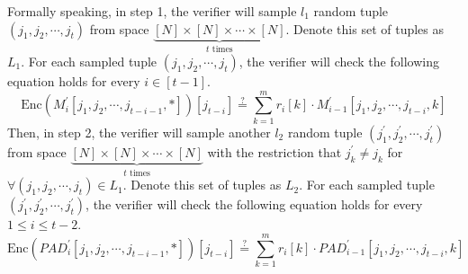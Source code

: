 \begin{itemize}
Formally speaking, in step 1, the verifier will sample $l_1$ random tuple $(j_1, j_2, \cdots, j_t)$ from space $\underbrace{[N] \times [N] \times \cdots \times [N]}_{t \text{ times}}$. Denote this set of tuples as $L_1$.
For each sampled tuple $(j_1, j_2, \cdots, j_t)$, the verifier will check the following equation holds for every $i \in [t-1]$.
$$
    \text{Enc}(M_i^\prime[j_1, j_2, \cdots, j_{t-i-1}, *])[j_{t-i}] \stackrel{?}{=} \sum_{k=1}^m r_i[k] \cdot M_{i-1}^{\prime}[j_1,j_2, \cdots, j_{t-i},k]
$$
Then, in step 2, the verifier will sample another $l_2$ random tuple $(j_1^\prime, j_2^\prime, \cdots, j_t^\prime)$ from space $\underbrace{[N] \times [N] \times \cdots \times [N]}_{t \text{ times}}$ with the restriction that $j_k^\prime \neq j_k$ for $\forall (j_1, j_2, \cdots, j_t) \in L_1$. Denote this set of tuples as $L_2$.
For each sampled tuple $(j_1^\prime, j_2^\prime, \cdots, j_t^\prime)$, the verifier will check the following equation holds for every $1 \le i \le t-2$.
$$
    \text{Enc}(PAD_i^\prime[j_1, j_2, \cdots, j_{t-i-1}, *])[j_{t-i}] \stackrel{?}{=} \sum_{k=1}^m r_i[k] \cdot PAD_{i-1}^{\prime}[j_1,j_2, \cdots, j_{t-i},k]
$$
    
\end{itemize}





    


